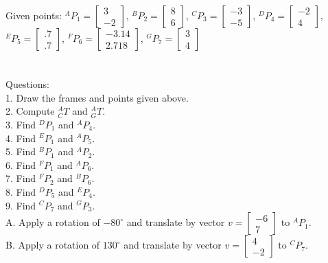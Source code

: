 \documentclass{article}
\begin{document}
Given points: ${}^{A}P_{1}=\begin{bmatrix}
3  \\
-2 
\end{bmatrix}$, ${}^{B}P_{2}=\begin{bmatrix}
8  \\
6 
\end{bmatrix}$, ${}^{C}P_{3}=\begin{bmatrix}
-3  \\
-5 
\end{bmatrix}$, ${}^{D}P_{4}=\begin{bmatrix}
-2  \\
4 
\end{bmatrix}$,${}^{E}P_{5}=\begin{bmatrix}
.7  \\
.7 
\end{bmatrix}$, ${}^{F}P_{6}=\begin{bmatrix}
-3.14  \\
2.718 
\end{bmatrix}$, ${}^{G}P_{7}=\begin{bmatrix}
3  \\
4 
\end{bmatrix}$ \\\\\\
Questions:\\
1. Draw the frames and points given above.\\
2. Compute ${}^{A}_{C}T$ and ${}^{A}_{G}T$. \\
3. Find ${}^{D}P_{1}$ and ${}^{A}P_{4}$. \\
4. Find ${}^{E}P_{1}$ and ${}^{A}P_{5}$. \\
5. Find ${}^{B}P_{1}$ and ${}^{A}P_{2}$.\\
6. Find ${}^{F}P_{1}$ and ${}^{A}P_{6}$. \\
7. Find ${}^{F}P_{2}$ and ${}^{B}P_{6}$. \\
8. Find ${}^{D}P_{5}$ and ${}^{E}P_{4}$. \\
9. Find ${}^{C}P_{7}$ and ${}^{G}P_{3}$. \\
A. Apply a rotation of $-80^\circ$ and translate by vector $v=\begin{bmatrix}
-6  \\
7 
\end{bmatrix}$ to ${}^{A}P_{1}$.\\
B. Apply a rotation of $130^\circ$ and translate by vector $v=\begin{bmatrix}
4  \\
-2 
\end{bmatrix}$ to ${}^{C}P_{7}$.\\\\
\end{document}
